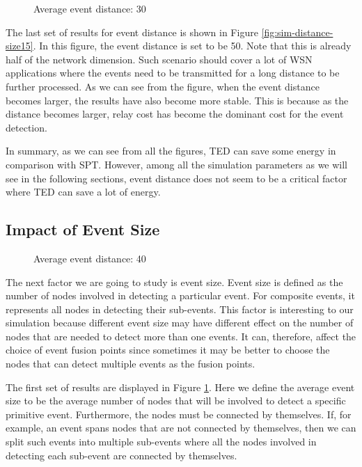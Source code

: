 \begin{figure}
\centering
{}
\caption{Average event distance: 30}
\label{fig:sim-size-distance30}
\end{figure}

The last set of results for event distance is shown in Figure \ref{fig:sim-distance-size15}. In this figure, the event distance is set to be 50. Note that this is already half of the network dimension. Such scenario should cover a lot of WSN applications where the events need to be transmitted for a long distance to be further processed. As we can see from the figure, when the event distance becomes larger, the results have also become more stable. This is because as the distance becomes larger, relay cost has become the dominant cost for the event detection.

In summary, as we can see from all the figures, TED can save some energy in comparison with SPT. However, among all the simulation parameters as we will see in the following sections, event distance does not seem to be a critical factor where TED can save a lot of energy.

\subsection{Impact of Event Size}
\begin{figure}
\centering
{}
\caption{Average event distance: 40}
\label{fig:sim-size-distance40}
\end{figure}

The next factor we are going to study is event size. Event size is defined as the number of nodes involved in detecting a particular event. For composite events, it represents all nodes in detecting their sub-events. This factor is interesting to our simulation because different event size may have different effect on the number of nodes that are needed to detect more than one events. It can, therefore, affect the choice of event fusion points since sometimes it may be better to choose the nodes that can detect multiple events as the fusion points.

The first set of results are displayed in Figure \ref{fig:sim-size-distance30}. Here we define the average event size to be the average number of nodes that will be involved to detect a specific primitive event. Furthermore, the nodes must be connected by themselves. If, for example, an event spans nodes that are not connected by themselves, then we can split such events into multiple sub-events where all the nodes involved in detecting each sub-event are connected by themselves.


